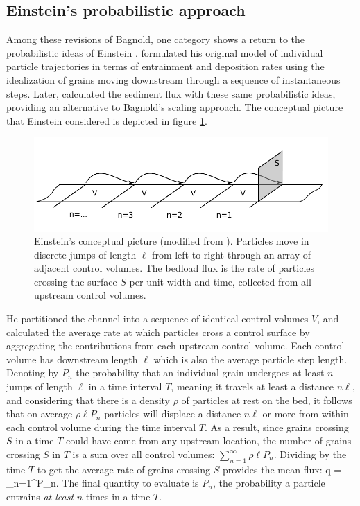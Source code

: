 \subsection{Einstein's probabilistic approach}

Among these revisions of Bagnold, one category shows a return to the probabilistic ideas of Einstein \citep{Parker2003,Ancey2006}.
\citet{Einstein1937} formulated his original model of individual particle trajectories in terms of entrainment and deposition rates using the idealization of grains moving downstream through a sequence of instantaneous steps.
Later, \citet{Einstein1942,Einstein1950} calculated the sediment flux with these same probabilistic ideas, providing an alternative to Bagnold's scaling approach.
The conceptual picture that Einstein considered is depicted in figure \ref{fig:einsteinFluxConcept}.
 \begin{figure}[!htbp]
	\includegraphics[width=\linewidth,keepaspectratio]{./figures/ch1/yalinDrawing.pdf}
	\caption{Einstein’s conceptual picture (modified from \citet{Yalin1972}). Particles move in discrete jumps of length $\ell$ from
left to right through an array of adjacent control volumes. The bedload flux is the rate of particles crossing
the surface $S$ per unit width and time, collected from all upstream control volumes.}
	\label{fig:einsteinFluxConcept}
\end{figure}

He partitioned the channel into a sequence of identical control volumes $V$, and calculated the average rate at which particles cross a control surface by aggregating the contributions from each upstream control volume.
Each control volume has downstream length $\ell$ which is also the average particle step length.
Denoting by $P_n$ the probability that an individual grain undergoes at least $n$ jumps of length $\ell$ in a time interval $T$, meaning it travels at least a distance $n \ell$, and considering that there is a density $\rho$ of particles at rest on the bed, it follows that on average $\rho \ell P_n$ particles will displace a distance $n \ell$ or more from within each control volume during the time interval $T$. 
As a result, since grains crossing $S$ in a time $T$ could have come from any upstream location, the number of grains crossing $S$ in $T$ is a sum over all control volumes: $\sum_{n=1}^\infty \rho \ell P_n$.
Dividing by the time $T$ to get the average rate of grains crossing $S$ provides the mean flux:
\be q =  \sum_{n=1}^\infty P_n. \label{eq:einflux} \ee
The final quantity to evaluate is $P_n$, the probability a particle entrains \textit{at least} $n$ times in a time $T$.

